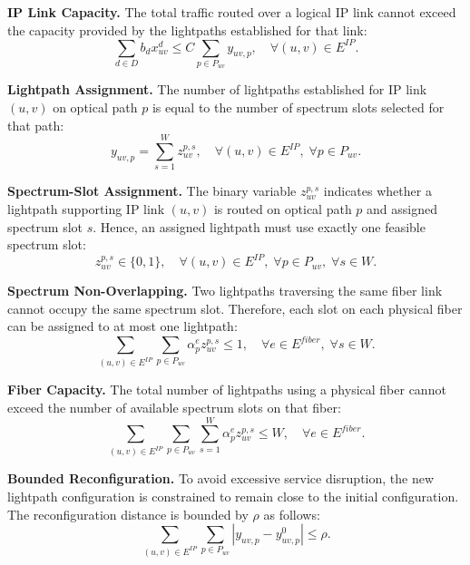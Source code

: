 \documentclass[conference]{IEEEtran}
\begin{document}
\textbf{IP Link Capacity.} The total traffic routed over a logical IP link cannot exceed the capacity provided by the lightpaths established for that link:
\begin{equation}
    \sum_{d\in D} b_d x^{d}_{uv}
    \leq
    C \sum_{p\in P_{uv}} y_{uv,p},
    \quad \forall (u,v)\in E^{IP}.
    \label{eq:capacity}
\end{equation}

\textbf{Lightpath Assignment.} The number of lightpaths established for IP link $(u,v)$ on optical path $p$ is equal to the number of spectrum slots selected for that path:
\begin{equation}
    y_{uv,p} = \sum_{s=1}^{W} z_{uv}^{p,s},
    \quad \forall (u,v)\in E^{IP},\; \forall p\in P_{uv}.
    \label{eq:lightpath-assignment}
\end{equation}

\textbf{Spectrum-Slot Assignment.} The binary variable $z_{uv}^{p,s}$ indicates whether a lightpath supporting IP link $(u,v)$ is routed on optical path $p$ and assigned spectrum slot $s$. Hence, an assigned lightpath must use exactly one feasible spectrum slot:
\begin{equation}
    z_{uv}^{p,s} \in \{0,1\},
    \quad \forall (u,v)\in E^{IP},\; \forall p\in P_{uv},\; \forall s \in W.
    \label{eq:z-domain-local}
\end{equation}

\textbf{Spectrum Non-Overlapping.} Two lightpaths traversing the same fiber link cannot occupy the same spectrum slot. Therefore, each slot on each physical fiber can be assigned to at most one lightpath:
\begin{equation}
    \sum_{(u,v)\in E^{IP}}
    \sum_{p\in P_{uv}}
    \alpha_{p}^{e} z_{uv}^{p,s}
    \leq 1,
    \quad \forall e\in E^{fiber},\; \forall s \in W.
    \label{eq:spectrum-nonoverlap}
\end{equation}

\textbf{Fiber Capacity.} The total number of lightpaths using a physical fiber cannot exceed the number of available spectrum slots on that fiber:
\begin{equation}
    \sum_{(u,v)\in E^{IP}}
    \sum_{p\in P_{uv}}
    \sum_{s=1}^{W}
    \alpha_{p}^{e} z_{uv}^{p,s}
    \leq W,
    \quad \forall e\in E^{fiber}.
    \label{eq:fiber-capacity}
\end{equation}

\textbf{Bounded Reconfiguration.} To avoid excessive service disruption, the new lightpath configuration is constrained to remain close to the initial configuration. The reconfiguration distance is bounded by $\rho$ as follows:
\begin{equation}
    \sum_{(u,v)\in E^{IP}}
    \sum_{p\in P_{uv}}
    \left|y_{uv,p} - y^{0}_{uv,p}\right|
    \leq \rho.
    \label{eq:non-disruptive}
\end{equation}
\end{document}

